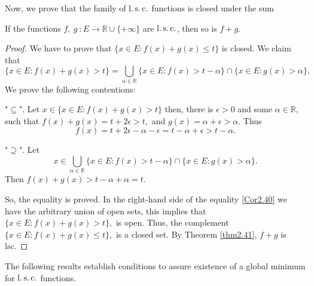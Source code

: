    \noindent Now, we prove that the family of $\operatorname{l.s.c.}$ functions is closed 
    under the sum 
    \begin{corollary}
        If the functions $f, \ g \ : E \to \mathbb{R} \cup \{+ \infty\}$ are 
        $\operatorname{l.s.c.}$, then so is $f + g$.
    \end{corollary}
    \begin{proof}
        We have to prove that $\{x \in E : f(x) + g(x) \leq t \}$ is closed. 
        We claim that
        \begin{equation}\label{Cor2.40}
            \{x \in E : f(x) + g(x) > t \} = \bigcup_{\alpha \in \mathbb{R}} %
                \{x \in E : f(x) > t - \alpha \} \cap \{x \in E : g(x) >  \alpha\},
        \end{equation}
        We prove the following contentions:
        \begin{asparaenum}
            \item["$\subseteq$".]
                Let $x \in \{x \in E : f(x) + g(x) > t \} $ then, there is
                $\epsilon > 0$ and some $\alpha \in \mathbb{R}$, such that
                $
                    f(x) + g(x) = t + 2\epsilon > t,
                $
                and 
                $
                    g(x) = \alpha + \epsilon > \alpha.
                $
                Thus 
                $$
                    f(x) = t + 2\epsilon - \alpha - \epsilon = t - \alpha %
                    + \epsilon > t - \alpha.
                $$
            \item["$\supseteq$".] Let
            $$
                x \in \bigcup_{\alpha \in \mathbb{R}} %
                \{x \in E : f(x) > t - \alpha \} \cap \{x \in E : g(x) >  \alpha\}.
            $$
            Then 
            $
                f(x) + g(x) > t -\alpha + \alpha = t.
            $
        \end{asparaenum}
        So, the equality is proved. In the right-hand side of the equality \eqref{Cor2.40} we have the
        arbitrary union of open sets, this implies that
        $
            \{x \in E : f(x) + g(x) > t \},
        $
        is open. Thus, the complement
        $
            \{x \in E : f(x) + g(x) \leq t \},
        $
        is a closed set. By Theorem \eqref{thm2.41}, $f + g $ is lsc.
    \end{proof}
    The following results establish conditions to assure existence of a global
    minimum for $\operatorname{l.s.c.}$ functions.
    
